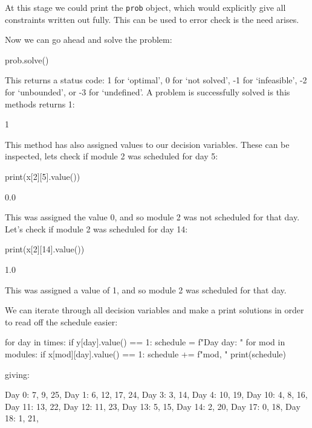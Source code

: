 At this stage we could print the \texttt{prob} object, which would
explicitly give all constraints written out fully. This can be used to error
check is the need arises.

Now we can go ahead and solve the problem:

\begin{pyin}
prob.solve()
\end{pyin}

This returns a status code: 1 for `optimal', 0 for `not solved', -1 for
`infeasible', -2 for `unbounded', or -3 for `undefined'. A problem is
successfully solved is this methods returns 1:

\begin{pyout}
1
\end{pyout}

This method has also assigned values to our decision variables. These can be
inspected, lets check if module 2 was scheduled for day 5:

\begin{pyin}
print(x[2][5].value())
\end{pyin}

\begin{pyout}
0.0
\end{pyout}

This was assigned the value 0, and so module 2 was not scheduled for that day.
Let's check if module 2 was scheduled for day 14:

\begin{pyin}
print(x[2][14].value())
\end{pyin}

\begin{pyout}
1.0
\end{pyout}

This was assigned a value of 1, and so module 2 was scheduled for that day.

We can iterate through all decision variables and make a print solutions in
order to read off the schedule easier:

\begin{pyin}
for day in times:
    if y[day].value() == 1:
        schedule = f"Day {day}: "
        for mod in modules:
            if x[mod][day].value() == 1:
                 schedule += f"{mod}, "
        print(schedule)
\end{pyin}

giving:

\begin{pyout}
Day 0: 7, 9, 25,
Day 1: 6, 12, 17, 24,
Day 3: 3, 14,
Day 4: 10, 19,
Day 10: 4, 8, 16,
Day 11: 13, 22,
Day 12: 11, 23,
Day 13: 5, 15,
Day 14: 2, 20,
Day 17: 0, 18,
Day 18: 1, 21,
\end{pyout}

